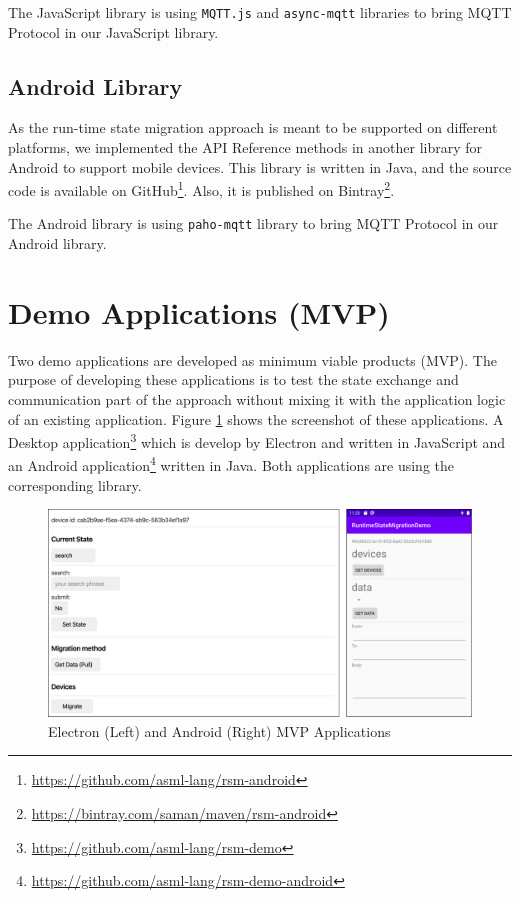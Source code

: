 The JavaScript library is using \lstinline[basicstyle=\ttfamily]{MQTT.js} and \lstinline[basicstyle=\ttfamily]{async-mqtt} libraries to bring MQTT Protocol in our JavaScript library.


\subsection{Android Library}
As the run-time state migration approach is meant to be supported on different platforms, we implemented the API Reference methods in another library for Android to support mobile devices. This library is written in Java, and
the source code is available on GitHub\footnote{\url{https://github.com/asml-lang/rsm-android}}. Also, it is published on Bintray\footnote{\url{https://bintray.com/saman/maven/rsm-android}}.

The Android library is using \lstinline[basicstyle=\ttfamily]{paho-mqtt} library to bring MQTT Protocol in our Android library.

\section{Demo Applications (MVP)}
Two demo applications are developed as minimum viable products (MVP). The purpose of developing these applications is to test the state exchange and communication part of the approach without mixing it with the application logic of an existing application. Figure \ref{fig:mvp} shows the screenshot of these applications. A Desktop application\footnote{\url{https://github.com/asml-lang/rsm-demo}} which is develop by Electron and written in JavaScript and an Android application\footnote{\url{https://github.com/asml-lang/rsm-demo-android}} written in Java. Both applications are using the corresponding library.

\FloatBarrier
\begin{figure}[H]
    \includegraphics[width=\linewidth]{../figures/mvp.png}
    \centering
    \caption{Electron (Left) and Android (Right) MVP Applications}
    \label{fig:mvp}
\end{figure}
\FloatBarrier

% 

